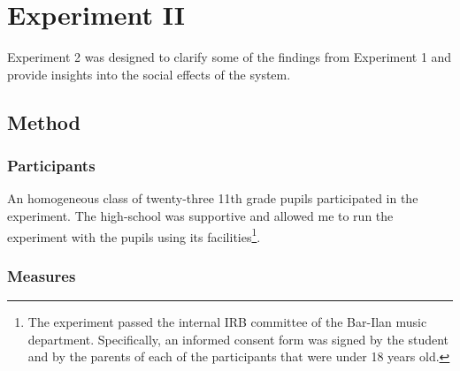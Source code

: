 \documentclass[a4paper,11pt]{article}
\begin{document}
{\section{Experiment II}

Experiment 2 was designed to clarify some of the findings from Experiment 1 and provide insights into the social effects of the system.

\subsection{Method}\label{methods:evaluation}

\subsubsection{Participants}

An homogeneous class of twenty-three 11th grade pupils participated in the experiment.
The high-school was supportive and allowed me to run the experiment with the pupils using its facilities\footnote{The experiment passed the internal IRB committee of the Bar-Ilan music department. Specifically, an informed consent form was signed by the student and by the parents of each of the participants that were under 18 years old.}.

\subsubsection{Measures}

}
\end{document}
